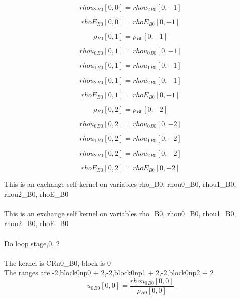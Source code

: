 \documentclass{article}
\begin{document}
\begin{dmath}{rhou_{2}{_{B0}}}[{0,0}] = {rhou_{2}{_{B0}}}[{0,-1}]\end{dmath}

\begin{dmath}{rhoE{_{B0}}}[{0,0}] = {rhoE{_{B0}}}[{0,-1}]\end{dmath}

\begin{dmath}{\rho{_{B0}}}[{0,1}] = {\rho{_{B0}}}[{0,-1}]\end{dmath}

\begin{dmath}{rhou_{0}{_{B0}}}[{0,1}] = {rhou_{0}{_{B0}}}[{0,-1}]\end{dmath}

\begin{dmath}{rhou_{1}{_{B0}}}[{0,1}] = {rhou_{1}{_{B0}}}[{0,-1}]\end{dmath}

\begin{dmath}{rhou_{2}{_{B0}}}[{0,1}] = {rhou_{2}{_{B0}}}[{0,-1}]\end{dmath}

\begin{dmath}{rhoE{_{B0}}}[{0,1}] = {rhoE{_{B0}}}[{0,-1}]\end{dmath}

\begin{dmath}{\rho{_{B0}}}[{0,2}] = {\rho{_{B0}}}[{0,-2}]\end{dmath}

\begin{dmath}{rhou_{0}{_{B0}}}[{0,2}] = {rhou_{0}{_{B0}}}[{0,-2}]\end{dmath}

\begin{dmath}{rhou_{1}{_{B0}}}[{0,2}] = {rhou_{1}{_{B0}}}[{0,-2}]\end{dmath}

\begin{dmath}{rhou_{2}{_{B0}}}[{0,2}] = {rhou_{2}{_{B0}}}[{0,-2}]\end{dmath}

\begin{dmath}{rhoE{_{B0}}}[{0,2}] = {rhoE{_{B0}}}[{0,-2}]\end{dmath}

\noindent This is an exchange self kernel on variables rho_B0, rhou0_B0, rhou1_B0, rhou2_B0, rhoE_B0\\\\\noindent This is an exchange self kernel on variables rho_B0, rhou0_B0, rhou1_B0, rhou2_B0, rhoE_B0\\\\\noindent Do loop stage,0, 2\\
\\\noindent The kernel is CRu0_B0, block is 0\\\noindent The ranges are -2,block0np0 + 2,-2,block0np1 + 2,-2,block0np2 + 2\\\begin{dmath}{u_{0}{_{B0}}}[{0,0}] = \frac{{rhou_{0}{_{B0}}}[{0,0}]}{{\rho{_{B0}}}[{0,0}]}\end{dmath}
\end{document}
